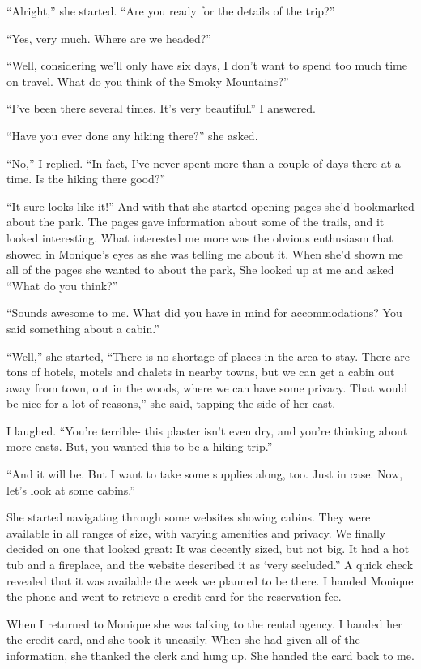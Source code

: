 ``Alright,'' she started. ``Are you ready for the details of the trip?''

``Yes, very much. Where are we headed?''

``Well, considering we'll only have six days, I don't want to spend too much time on travel.
What do you think of the Smoky Mountains?''

``I've been there several times. It's very beautiful.'' I answered.

``Have you ever done any hiking there?'' she asked.

``No,'' I replied. ``In fact, I've never spent more than a couple of days there at a time. Is
the hiking there good?''

``It sure looks like it!'' And with that she started opening pages she'd bookmarked about the
park. The pages gave information about some of the trails, and it looked interesting. What
interested me more was the obvious enthusiasm that showed in Monique's eyes as she was telling
me about it. When she'd shown me all of the pages she wanted to about the park, She looked up at
me and asked ``What do you think?''

``Sounds awesome to me. What did you have in mind for accommodations? You said something
about a cabin.''

``Well,'' she started, ``There is no shortage of places in the area to stay. There are tons of
hotels, motels and chalets in nearby towns, but we can get a cabin out away from town, out in
the woods, where we can have some privacy. That would be nice for a lot of reasons,'' she said,
tapping the side of her cast.

I laughed. ``You're terrible- this plaster isn't even dry, and you're thinking about more
casts. But, you wanted this to be a hiking trip.''

``And it will be. But I want to take some supplies along, too. Just in case. Now, let's look
at some cabins.''

She started navigating through some websites showing cabins. They were available in all
ranges of size, with varying amenities and privacy. We finally decided on one that looked great:
It was decently sized, but not big. It had a hot tub and a fireplace, and the website described
it as ‘very secluded.'' A quick check revealed that it was available the week we planned to be
there. I handed Monique the phone and went to retrieve a credit card for the reservation fee.

When I returned to Monique she was talking to the rental agency. I handed her the credit
card, and she took it uneasily. When she had given all of the information, she thanked the clerk
and hung up. She handed the card back to me.

